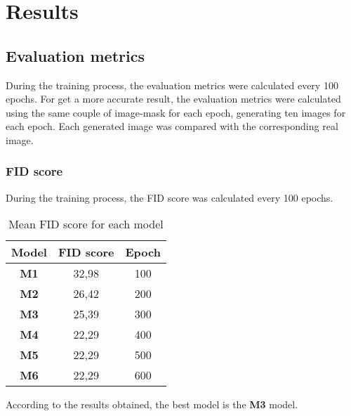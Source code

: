 
\section{Results}\label{sec:results}
\subsection{Evaluation metrics}
During the training process, the evaluation metrics were calculated every 100 epochs.
For get a more accurate result, the evaluation metrics were calculated using the same couple of image-mask for each epoch, generating ten images for each epoch.
Each generated image was compared with the corresponding real image.
\subsubsection{FID score}
During the training process, the FID score was calculated every 100 epochs. 
\begin{table}[H]
    \centering
    \begin{tabular}{|c|c|c|}
        \hline
        \textbf{Model} & \textbf{FID score} & \textbf{Epoch} \\
        \hline
        \hline
        \textbf{M1} & 32,98 & 100 \\
        \hline
        \textbf{M2} & 26,42 & 200 \\
        \hline
        \textbf{M3} & 25,39 & 300 \\
        \hline
        \textbf{M4} & 22,29 & 400 \\
        \hline
        \textbf{M5} & 22,29 & 500 \\
        \hline
        \textbf{M6} & 22,29 & 600 \\
    \end{tabular}
    \caption{Mean FID score for each model}\label{tab:fid-score}
\end{table}
According to the results obtained, the best model is the \textbf{M3} model.
